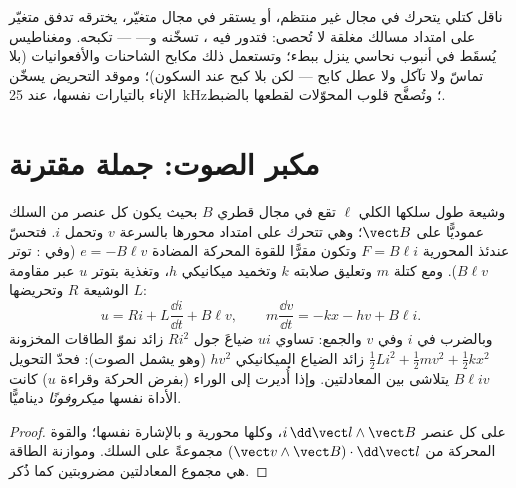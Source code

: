 \begin{example}\label{ex:b1:induction:eddy}
ناقل كتلي يتحرك في مجال غير منتظم، أو يستقر في
مجال متغيّر، يخترقه تدفق متغيّر على امتداد مسالك مغلقة لا تُحصى:
فتدور فيه \emph{}، تسخّنه و---  ---
تكبحه. ومغناطيس يُسقَط في أنبوب نحاسي ينزل ببطء؛ وتستعمل ذلك
مكابح الشاحنات والأفعوانيات (بلا تماسّ ولا تآكل ولا
عطل كابح --- لكن بلا كبح عند السكون)؛ وموقد التحريض يسخّن
الإناء بالتيارات نفسها، عند \qty{25}{kHz}؛ وتُصفَّح قلوب المحوّلات
لقطعها بالضبط.
\end{example}

\section{مكبر الصوت: جملة مقترنة}

\begin{proposition}\label{prop:b1:induction:loudspeaker}
وشيعة طول سلكها الكلي $\ell$ تقع في مجال قطري $B$ بحيث يكون
كل عنصر من السلك عموديًّا على $\vect B$؛ وهي تتحرك على امتداد محورها
بالسرعة $v$ وتحمل $i$. فتحسّ عندئذ  المحورية
$F = B\ell i$ وتكون مقرًّا للقوة المحركة المضادة $e = -B\ell v$ (وفي : توتر $B\ell v$). ومع كتلة $m$ وتعليق
صلابته $k$ وتخميد ميكانيكي $h$، وتغذية بتوتر $u$ عبر
مقاومة الوشيعة $R$ وتحريضها $L$:
\[
u = Ri + L\frac{\dd i}{\dd t} + B\ell v , \qquad
m\frac{\dd v}{\dd t} = -kx - hv + B\ell i .
\]
وبالضرب في $i$ وفي $v$ والجمع: تساوي  $ui$
ضياعَ جول $Ri^2$ زائد نموّ الطاقات المخزونة
$\tfrac12Li^2 + \tfrac12mv^2 + \tfrac12kx^2$ زائد الضياع الميكانيكي
$hv^2$ (وهو يشمل الصوت): فحدّ التحويل $B\ell iv$ يتلاشى
بين المعادلتين. وإذا أُديرت إلى الوراء (بفرض الحركة وقراءة $u$) كانت
الأداة نفسها \emph{ميكروفونًا} ديناميًّا.
\end{proposition}

\begin{proof}
 على كل عنصر $i\,\dd\vect l\wedge\vect B$، وكلها محورية و
بالإشارة نفسها؛ والقوة المحركة من $(\vect v\wedge\vect B)\cdot\dd\vect l$ مجموعةً
على السلك. وموازنة الطاقة هي مجموع المعادلتين
مضروبتين كما ذُكر.
\end{proof}

